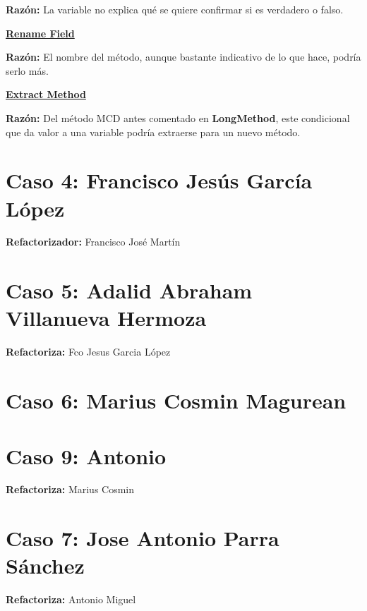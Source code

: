 \documentclass[11pt,a4paper,oneside]{book}
\begin{document}
    \textbf{Razón:} La variable no explica qué se quiere confirmar si es verdadero o falso.
    
    
    
    \hyperref[RenameField]{\textbf{Rename Field}}
    
    \textbf{Razón:} El nombre del método, aunque bastante indicativo de lo que hace, podría serlo más.
    
    
    
    \hyperref[ExtractMethod]{\textbf{Extract Method}}
    
    \textbf{Razón:} Del método MCD antes comentado en \textbf{LongMethod}, este condicional que da valor a una variable podría extraerse para un nuevo método.
    
    
    
    


\chapter {Caso 4: Francisco Jesús García López}
\textbf{Refactorizador:} Francisco José Martín







\chapter {Caso 5: Adalid Abraham Villanueva Hermoza}
\textbf{Refactoriza:} Fco Jesus Garcia López


\chapter {Caso 6: Marius Cosmin Magurean}


\chapter {Caso 9: Antonio}
\textbf{Refactoriza:} Marius Cosmin


\chapter {Caso 7: Jose Antonio Parra Sánchez}
\textbf{Refactoriza:} Antonio Miguel
\end{document}
